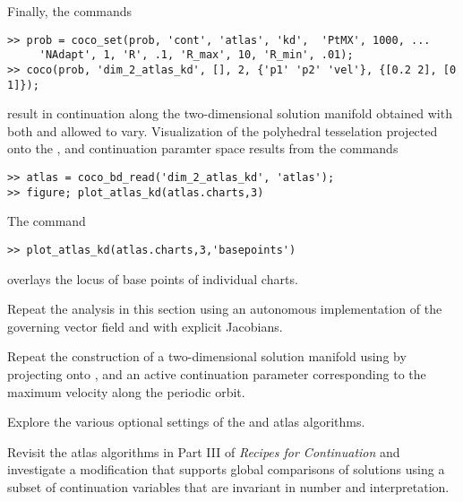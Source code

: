 Finally, the commands
\begin{lstlisting}[language=coco-highlight]
>> prob = coco_set(prob, 'cont', 'atlas', 'kd',  'PtMX', 1000, ...
     'NAdapt', 1, 'R', .1, 'R_max', 10, 'R_min', .01);
>> coco(prob, 'dim_2_atlas_kd', [], 2, {'p1' 'p2' 'vel'}, {[0.2 2], [0 1]});
\end{lstlisting}
result in continuation along the two-dimensional solution manifold obtained with both  and  allowed to vary. Visualization of the polyhedral tesselation projected onto the ,  and  continuation paramter space results from the commands
\begin{lstlisting}[language=coco-highlight]
>> atlas = coco_bd_read('dim_2_atlas_kd', 'atlas');
>> figure; plot_atlas_kd(atlas.charts,3)
\end{lstlisting}
The command
\begin{lstlisting}[language=coco-highlight]
>> plot_atlas_kd(atlas.charts,3,'basepoints')
\end{lstlisting}
overlays the locus of base points of individual charts.\\
\medskip

\begin{exercises}
\item Repeat the analysis in this section using an autonomous implementation of the governing vector field and with explicit Jacobians.
\item Repeat the construction of a two-dimensional solution manifold using  by projecting onto ,  and an active continuation parameter corresponding to the maximum velocity along the periodic orbit.
\item Explore the various optional settings of the  and  atlas algorithms.
\item Revisit the atlas algorithms in Part III of \emph{Recipes for Continuation} and investigate a modification that supports global comparisons of solutions using a subset of continuation variables that are invariant in number and interpretation.
\end{exercises}
    
 
